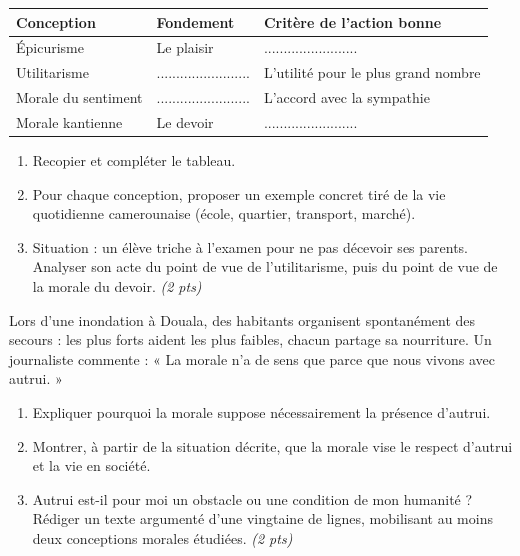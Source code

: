 \documentclass[11pt]{article}
\begin{document}
\begin{exercice}
\begin{center}
\begin{tabular}{|l|l|l|}
\hline
\textbf{Conception} & \textbf{Fondement} & \textbf{Critère de l'action bonne} \\
\hline
Épicurisme & Le plaisir & ........................ \\
\hline
Utilitarisme & ........................ & L'utilité pour le plus grand nombre \\
\hline
Morale du sentiment & ........................ & L'accord avec la sympathie \\
\hline
Morale kantienne & Le devoir & ........................ \\
\hline
\end{tabular}
\end{center}
\begin{enumerate}
\item Recopier et compléter le tableau.
\item Pour chaque conception, proposer un exemple concret tiré de la vie quotidienne camerounaise (école, quartier, transport, marché).
\item Situation : un élève triche à l'examen pour ne pas décevoir ses parents. Analyser son acte du point de vue de l'utilitarisme, puis du point de vue de la morale du devoir. \textit{(2 pts)}
\end{enumerate}
\end{exercice}

\begin{exercice}
Lors d'une inondation à Douala, des habitants organisent spontanément des secours : les plus forts aident les plus faibles, chacun partage sa nourriture. Un journaliste commente : « La morale n'a de sens que parce que nous vivons avec autrui. »
\begin{enumerate}
\item Expliquer pourquoi la morale suppose nécessairement la présence d'autrui.
\item Montrer, à partir de la situation décrite, que la morale vise le respect d'autrui et la vie en société.
\item Autrui est-il pour moi un obstacle ou une condition de mon humanité ? Rédiger un texte argumenté d'une vingtaine de lignes, mobilisant au moins deux conceptions morales étudiées. \textit{(2 pts)}
\end{enumerate}
\end{exercice}
\end{document}
